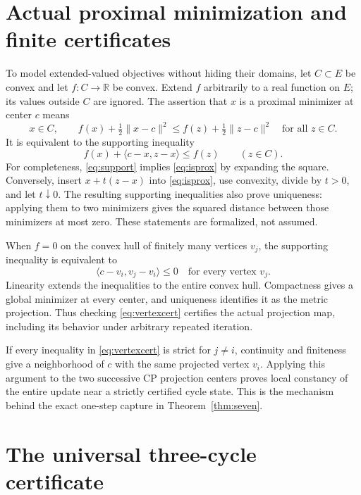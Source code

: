 \documentclass[11pt]{article}
\theoremstyle{remark}\newtheorem{remark}[theorem]{Remark}
\newcommand{\R}{\mathbb R}
\newcommand{\ip}[2]{\langle #1,#2\rangle}
\newcommand{\norm}[1]{\lVert #1\rVert}
\begin{document}
\section{Actual proximal minimization and finite certificates}\label{sec:prox}

To model extended-valued objectives without hiding their domains, let $C\subset E$ be convex and let $f:C\to\R$ be convex. Extend $f$ arbitrarily to a real function on $E$; its values outside $C$ are ignored. The assertion that $x$ is a proximal minimizer at center $c$ means
\begin{equation}\label{eq:isprox}
 x\in C,\qquad
 f(x)+\tfrac12\norm{x-c}^2\le f(z)+\tfrac12\norm{z-c}^2
 \quad\text{for all }z\in C.
\end{equation}
It is equivalent to the supporting inequality
\begin{equation}\label{eq:support}
 f(x)+\ip{c-x}{z-x}\le f(z)\qquad(z\in C).
\end{equation}
For completeness, \eqref{eq:support} implies \eqref{eq:isprox} by expanding the square. Conversely, insert $x+t(z-x)$ into \eqref{eq:isprox}, use convexity, divide by $t>0$, and let $t\downarrow0$. The resulting supporting inequalities also prove uniqueness: applying them to two minimizers gives the squared distance between those minimizers at most zero. These statements are formalized, not assumed.

When $f=0$ on the convex hull of finitely many vertices $v_j$, the supporting inequality is equivalent to
\begin{equation}\label{eq:vertexcert}
 \ip{c-v_i}{v_j-v_i}\le0\quad\text{for every vertex }v_j.
\end{equation}
Linearity extends the inequalities to the entire convex hull. Compactness gives a global minimizer at every center, and uniqueness identifies it as the metric projection. Thus checking \eqref{eq:vertexcert} certifies the actual projection map, including its behavior under arbitrary repeated iteration.

If every inequality in \eqref{eq:vertexcert} is strict for $j\ne i$, continuity and finiteness give a neighborhood of $c$ with the same projected vertex $v_i$. Applying this argument to the two successive CP projection centers proves local constancy of the entire update near a strictly certified cycle state. This is the mechanism behind the exact one-step capture in Theorem~\ref{thm:seven}.

\section{The universal three-cycle certificate}
\end{document}
